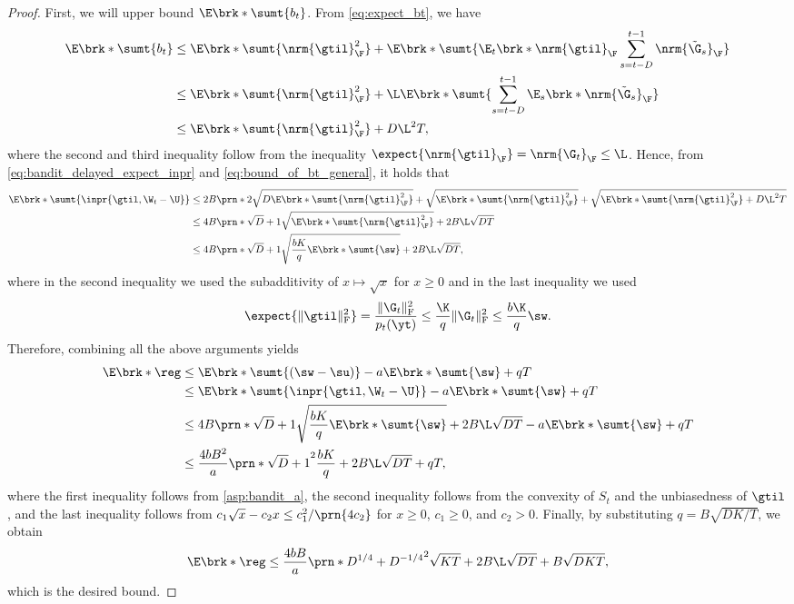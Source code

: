 \begin{proof}
First, we will upper bound $\E\brk*{\sumt{b_t}}$.
From \eqref{eq:expect_bt}, we have
\begin{align}\label{eq:bound_of_bt_general}
    \E\brk*{\sumt{b_t}}&\leq \E\brk*{\sumt{\nrm{\gtil}_\F^2}} + \E\brk*{\sumt
    {\E_t\brk*{\nrm{\gtil}_\F}\sum_{s=t-D}^{t-1}\nrm{\tilde{\G}_s}_\F}}\nonumber\\
    &\leq \E\brk*{\sumt{\nrm{\gtil}_\F^2}} + \L\E\brk*{\sumt{\sum_{s=t-D}^{t-1}\E_s\brk*{\nrm{\tilde{\G}_s}_\F}}}\nonumber\\
    &\leq \E\brk*{\sumt{\nrm{\gtil}_\F^2}} + D\L^2 T,
\end{align}
where the second and third inequality follow from the inequality $\expect{\nrm{\gtil}_\F}=\nrm{\G_t}_\F\leq \L$.
Hence, from \eqref{eq:bandit_delayed_expect_inpr} and \eqref{eq:bound_of_bt_general}, it holds that
\begin{align}
    \E\brk*{\sumt{\inpr{\gtil,\W_t-\U}}}
    &\leq 2B\prn*{2\sqrt{D\E\brk*{\sumt{\nrm{\gtil}_\F^2}}}+\sqrt{\E\brk*{\sumt{\nrm{\gtil}_\F^2}}}
    +
    \sqrt{{\E\brk*{\sumt{\nrm{\gtil}_\F^2}} + D\L^2 T}}}\nonumber\\
    &\leq 4B\prn*{\sqrt{D}+1}\sqrt{\E\brk*{\sumt{\nrm{\gtil}_\F^2}}}+2 B\L\sqrt{ D T}\nonumber\\
    &\leq 4B\prn*{\sqrt{D}+1}\sqrt{\frac{bK}{q}\E\brk*{\sumt{\sw}}}+2B\L\sqrt{ D T},
\end{align}
where in the second inequality we used the subadditivity of $x \mapsto \sqrt{x}$ for $x \geq 0$ and in the last inequality we used 
\begin{equation*}
\expect{\|\gtil\|_{\mathrm{F}}^2}
=
\frac{\|\G_t\|_{\mathrm{F}}^2}{p_t(\yt)}
\leq
\frac{\K }{q}\|\G_t\|_{\mathrm{F}}^2
\leq
\frac{b\K }{q}\sw.
\end{equation*}
Therefore, combining all the above arguments yields 
\begin{align*}
    \E\brk*{\reg}&
    \leq \E\brk*{\sumt{(\sw-\su)}} - a\E\brk*{\sumt{\sw}} + q T\\
    &\leq \E\brk*{\sumt{\inpr{\gtil,\W_t-\U}}} - a\E\brk*{\sumt{\sw}} + q T\\
    &\leq 4B\prn*{\sqrt{D}+1}\sqrt{\frac{bK}{q}\E\brk*{\sumt{\sw}}}+2 B\L\sqrt{ D T}- a\E\brk*{\sumt{\sw}} + q T\\
    &\leq \frac{4bB^2}{a}\prn*{\sqrt{D}+1}^2\frac{bK}{q}+2 B\L\sqrt{D T}+ q T,
\end{align*}
where the first inequality follows from \cref{asp:bandit_a},
the second inequality follows from the convexity of $S_t$ and the unbiasedness of $\gtil$,
and the last inequality follows from $c_1\sqrt{x}-c_2x\leq{c_1^2}/\prn{4c_2}$ for $x \geq 0$, $c_1 \geq 0$, and $c_2 > 0$.
Finally, by substituting $q=B\sqrt{DK/T}$, we obtain
\begin{equation*}
    \E\brk*{\reg}
    \leq
    \frac{4bB}{a}\prn*{D^{1/4}+D^{-1/4}}^2\sqrt{KT}+2B \L\sqrt{D T}+B\sqrt{DKT},
\end{equation*}
which is the desired bound.
\end{proof}





